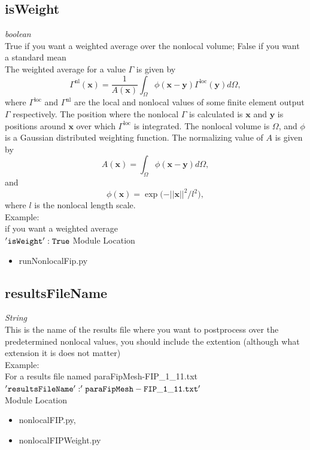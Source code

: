 \documentclass[11pt]{article}
\begin{document}
\subsection{isWeight}
\emph{boolean} \\
True if you want a weighted average over the nonlocal volume; False if you want a standard mean \\
The weighted average for a value $\Gamma$ is given by
\begin{equation}
\Gamma^{\textrm{nl}}(\pmb{x})  = \frac{1}{A(\pmb{x})}
\int_{\Omega}\phi(\pmb{x} - \pmb{y}) 
\Gamma^{\textrm{loc}}(\pmb{y}) d\Omega,
\label{eq:fipnl}
\end{equation}
where $\Gamma^{\textrm{loc}}$ and $\Gamma^{\textrm{nl}}$ are the local and nonlocal values of some finite element output $\Gamma$ respectively. The position where the nonlocal $\Gamma$ is calculated is $\pmb{x}$ and $\pmb{y}$ is positions around $\pmb{x}$ over which $\Gamma^{\textrm{loc}}$  is integrated. The nonlocal volume is $\Omega$, and  $\phi$ is a Gaussian distributed weighting function. The normalizing value of $A$ is given by 
\begin{equation}
A(\pmb{x}) = 
\int_{\Omega}\phi(\pmb{x} - \pmb{y}) 
 d\Omega,
\label{eq:a}
\end{equation}
and 
\begin{equation}
\phi(\pmb{x}) = 
\exp{(-||\pmb{x}||^2/l^2}),
\label{eq:phi}
\end{equation}
where $l$ is the nonlocal length scale.\\
Example:\\
if you want a weighted average \\
$\tt{'isWeight' : True}$
Module Location\\
\begin{itemize}
  \item runNonlocalFip.py
\end{itemize}
\subsection{resultsFileName}
\emph{String} \\
This is the name of the results file where you want to postprocess over the predetermined nonlocal values, you should include the extention (although what extension it is does not matter)\\
Example:\\
For a results file named paraFipMesh-FIP\_1\_11.txt\\
{$\tt{'resultsFileName' : 'paraFipMesh-FIP\_1\_11.txt'}$}\\
Module Location\\
\begin{itemize}
  \item nonlocalFIP.py,
  \item nonlocalFIPWeight.py
\end{itemize}
\end{document}
